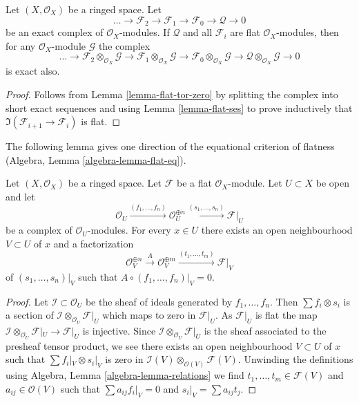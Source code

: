 \begin{lemma}
\label{lemma-flat-resolution-of-flat}
Let $(X, \mathcal{O}_X)$ be a ringed space.
Let
$$
\ldots \to
\mathcal{F}_2 \to
\mathcal{F}_1 \to
\mathcal{F}_0 \to
\mathcal{Q} \to 0
$$
be an exact complex of $\mathcal{O}_X$-modules.
If $\mathcal{Q}$ and all $\mathcal{F}_i$ are flat $\mathcal{O}_X$-modules,
then for any $\mathcal{O}_X$-module $\mathcal{G}$ the complex
$$
\ldots \to
\mathcal{F}_2 \otimes_{\mathcal{O}_X} \mathcal{G} \to
\mathcal{F}_1 \otimes_{\mathcal{O}_X} \mathcal{G} \to
\mathcal{F}_0 \otimes_{\mathcal{O}_X} \mathcal{G} \to
\mathcal{Q} \otimes_{\mathcal{O}_X} \mathcal{G} \to 0
$$
is exact also.
\end{lemma}

\begin{proof}
Follows from Lemma \ref{lemma-flat-tor-zero} by splitting the complex
into short exact sequences and using Lemma \ref{lemma-flat-ses} to
prove inductively that $\Im(\mathcal{F}_{i + 1} \to \mathcal{F}_i)$
is flat.
\end{proof}

\noindent
The following lemma gives one direction of the equational criterion of
flatness (Algebra, Lemma \ref{algebra-lemma-flat-eq}).

\begin{lemma}
\label{lemma-flat-eq}
Let $(X, \mathcal{O}_X)$ be a ringed space. Let $\mathcal{F}$ be a flat
$\mathcal{O}_X$-module. Let $U \subset X$ be open and let
$$
\mathcal{O}_U \xrightarrow{(f_1, \ldots, f_n)}
\mathcal{O}_U^{\oplus n} \xrightarrow{(s_1, \ldots, s_n)}
\mathcal{F}|_U
$$
be a complex of $\mathcal{O}_U$-modules. For every $x \in U$ there
exists an open neighbourhood $V \subset U$ of $x$ and a factorization
$$
\mathcal{O}_V^{\oplus n}
\xrightarrow{A}
\mathcal{O}_V^{\oplus m} \xrightarrow{(t_1, \ldots, t_m)}
\mathcal{F}|_V
$$
of $(s_1, \ldots, s_n)|_V$ such that $A \circ (f_1, \ldots, f_n)|_V = 0$.
\end{lemma}

\begin{proof}
Let $\mathcal{I} \subset \mathcal{O}_U$ be the sheaf of ideals
generated by $f_1, \ldots, f_n$. Then $\sum f_i \otimes s_i$ is
a section of $\mathcal{I} \otimes_{\mathcal{O}_U} \mathcal{F}|_U$
which maps to zero in $\mathcal{F}|_U$. As $\mathcal{F}|_U$ is flat
the map
$\mathcal{I} \otimes_{\mathcal{O}_U} \mathcal{F}|_U \to \mathcal{F}|_U$
is injective. Since $\mathcal{I} \otimes_{\mathcal{O}_U} \mathcal{F}|_U$
is the sheaf associated to the presheaf tensor product, we see
there exists an open neighbourhood $V \subset U$ of $x$ such
that $\sum f_i|_V \otimes s_i|_V$ is zero in
$\mathcal{I}(V) \otimes_{\mathcal{O}(V)} \mathcal{F}(V)$.
Unwinding the definitions using Algebra, Lemma \ref{algebra-lemma-relations}
we find $t_1, \ldots, t_m \in \mathcal{F}(V)$ and $a_{ij} \in \mathcal{O}(V)$
such that $\sum a_{ij}f_i|_V = 0$ and $s_i|_V = \sum a_{ij}t_j$.
\end{proof}














